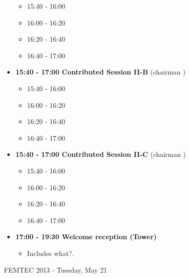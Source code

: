 \documentclass[10pt, A4]{article}%
\begin{document}
\begin{itemize}
  \begin{itemize}
    \item 15:40 - 16:00
    \item 16:00 - 16:20 
    \item 16:20 - 16:40 
    \item 16:40 - 17:00 
  \end{itemize}
  \item {\bf 15:40 - 17:00 Contributed Session II-B} (chairman ) 
  \begin{itemize}
    \item 15:40 - 16:00
    \item 16:00 - 16:20 
    \item 16:20 - 16:40 
    \item 16:40 - 17:00 
  \end{itemize}
    \item {\bf 15:40 - 17:00 Contributed Session II-C} (chairman ) 
  \begin{itemize}
    \item 15:40 - 16:00
    \item 16:00 - 16:20 
    \item 16:20 - 16:40 
    \item 16:40 - 17:00 
  \end{itemize}    
  \item {\bf 17:00 - 19:30 Welcome reception (Tower)} 
  \begin{itemize}
     \item Includes what?.
  \end{itemize}
\end{itemize}

\newpage

\centerline{\huge FEMTEC 2013 - Tuesday, May 21}
\vspace{4mm}
\end{document}
